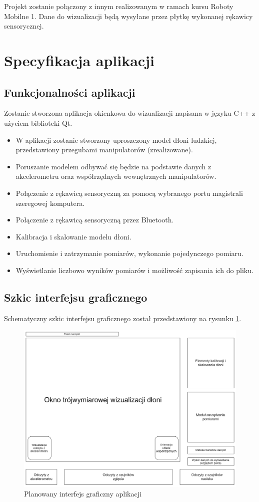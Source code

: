 \documentclass[12pt,a4paper]{article}
\begin{document}
Projekt zostanie połączony z innym realizowanym w ramach kursu Roboty Mobilne 1. Dane do wizualizacji będą wysyłane przez płytkę wykonanej rękawicy sensorycznej.

\section{Specyfikacja aplikacji}

\subsection{Funkcjonalności aplikacji}
Zostanie stworzona aplikacja okienkowa do wizualizacji napisana w języku C++ z użyciem biblioteki Qt.\\
\begin{itemize}
\item W aplikacji zostanie stworzony uproszczony model dłoni ludzkiej, przedstawiony przegubami manipulatorów (zrealizowane).
\item Poruszanie modelem odbywać się będzie na podstawie danych z akcelerometru oraz współrzędnych wewnętrznych manipulatorów.
\item Połączenie z rękawicą sensoryczną za pomocą wybranego portu magistrali szeregowej komputera.
\item Połączenie z rękawicą sensoryczną przez Bluetooth.
\item Kalibracja i skalowanie modelu dłoni.
\item Uruchomienie i zatrzymanie pomiarów, wykonanie pojedynczego pomiaru.
\item Wyświetlanie liczbowo wyników pomiarów i możliwość zapisania ich do pliku.
\end{itemize}
\newpage
\subsection{Szkic interfejsu graficznego}
Schematyczny szkic interfejsu graficznego został przedstawiony na rysunku \ref{fig:interface}.
\begin{figure}[!htb]
\centering
\includegraphics[width=\textwidth]{./WDS_schemat_ideowy_okna_programu.png}
\caption{Planowany interfejs graficzny aplikacji\label{fig:interface}}
\end{figure}
\end{document}

